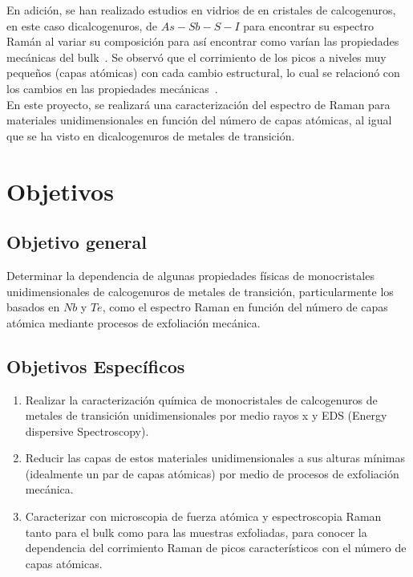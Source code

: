 \documentclass{article}
\begin{document}
En adición, se han realizado estudios en vidrios de en cristales de calcogenuros, en este caso dicalcogenuros, de $As-Sb-S-I$ para encontrar su espectro Ramán al variar su composición para así encontrar como varían las propiedades mecánicas del bulk~\cite{PRABHUDESSAI201956}. Se observó que el corrimiento de los picos a niveles muy pequeños (capas atómicas) con cada cambio estructural, lo cual se relacionó con los cambios en las propiedades mecánicas~\cite{PRABHUDESSAI201956}.\\

En este proyecto, se realizará una caracterización del espectro de Raman para materiales unidimensionales en función del número de capas atómicas, al igual que se ha visto en dicalcogenuros de metales de transición.

\section{Objetivos}
\subsection{Objetivo general}

Determinar la dependencia de algunas propiedades físicas de monocristales unidimensionales de calcogenuros de metales de transición, particularmente los basados en $Nb$ y $Te$, como el espectro Raman en función del número de capas atómica mediante procesos de exfoliación mecánica.

\subsection{Objetivos Específicos}

\begin{enumerate}
    \item Realizar la caracterización química de monocristales de calcogenuros de metales de transición unidimensionales por medio rayos x y EDS (Energy dispersive Spectroscopy).
    \item Reducir las capas de estos materiales unidimensionales a sus alturas mínimas (idealmente un par de capas atómicas) por medio de procesos de exfoliación mecánica.
    \item Caracterizar con microscopia de fuerza atómica y espectroscopia Raman tanto para el bulk como para las muestras exfoliadas, para conocer la dependencia del corrimiento Raman de picos característicos con el número de capas atómicas.
\end{enumerate}
\end{document}
